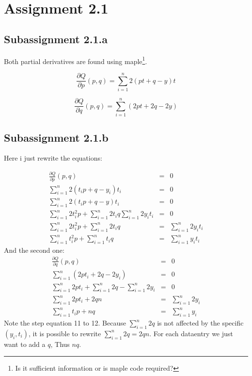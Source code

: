 \documentclass[english]{article}
\begin{document}
\section*{Assignment 2.1}
\subsection*{Subassignment 2.1.a}

Both partial derivatives are found using maple\footnote{Is it sufficient information or is maple code required?}.

\begin{equation}
\frac{\partial Q}{\partial p}(p,q)=\sum\limits_{i=1}^n 2(pt+q-y)t
\end{equation}

\begin{equation}
\frac{\partial Q}{\partial q}(p,q)=\sum\limits_{i=1}^n (2pt+2q-2y)
\end{equation}
\subsection*{Subassignment 2.1.b}
Here i just rewrite the equations:

\begin{eqnarray}
	\frac{\partial Q}{\partial p}(p,q) & = & 0\\
	\sum\limits_{i=1}^n 2(t_i p +q-y_i)t_i & = & 0 \\
	\sum\limits_{i=1}^n 2(t_i p  +q-y)t_i & = & 0 \\
	\sum\limits_{i=1}^n 2t_i^2 p +\sum\limits_{i=1}^n 2t_i q \sum\limits_{i=1}^n 2y_i t_i & = & 0 \\
	\sum\limits_{i=1}^n 2t_i ^2 p +\sum\limits_{i=1}^n 2t_i q & = & \sum\limits_{i=1}^n 2y_i t_i\\
	\sum\limits_{i=1}^n t_i^2 p +\sum\limits_{i=1}^n t_i q & = & \sum\limits_{i=1}^n y_i t_i 
\end{eqnarray}
And the second one:
\begin{eqnarray}
	\frac{\partial Q}{\partial q}(p,q) & = & 0 \\
	\sum\limits_{i=1}^n (2pt_i+2q-2y_i) & = & 0 \\
	\sum\limits_{i=1}^n 2pt_i+ \sum\limits_{i=1}^n 2q- \sum\limits_{i=1}^n 2y_i & = & 0 \\
	\sum\limits_{i=1}^n 2pt_i+ 2qn & = & \sum\limits_{i=1}^n 2y_i \\
	\sum\limits_{i=1}^n t_i p + nq & = & \sum\limits_{i=1}^n y_i
\end{eqnarray}
Note the step equation 11 to 12. Because $\sum\limits_{i=1}^n 2q$ is not affected by the specific $(y_i,t_i)$, it is possible to rewrite  $\sum\limits_{i=1}^n 2q =2qn$. For each dataentry we just want to add a $q$, Thus $nq$.
\end{document}
